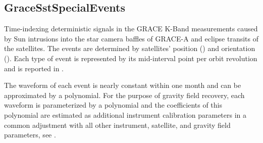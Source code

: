 \clearpage
\subsection{GraceSstSpecialEvents}\label{GraceSstSpecialEvents}
Time-indexing deterministic signals in the GRACE K-Band measurements caused by Sun intrusions
into the star camera baffles of GRACE-A and eclipse transits of the satellites.
The events are determined by satellites' position ()
and orientation (). Each type of event is represented
by its mid-interval point per orbit revolution and is reported in .

The waveform of each event is nearly constant within one month and can be approximated by a polynomial.
For the purpose of gravity field recovery, each waveform is parameterized by a polynomial and the coefficients
of this polynomial are estimated as additional instrument calibration parameters in a common adjustment
with all other instrument, satellite, and gravity field parameters,
see .


